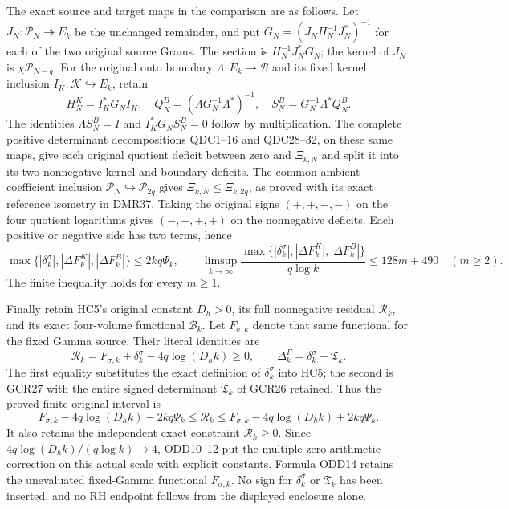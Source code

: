\documentclass[11pt,a4paper]{article}
\begin{document}
The exact source and target maps in the comparison are as follows.
Let $J_N:\mathcal P_N\twoheadrightarrow E_k$ be the unchanged
remainder, and put $G_N=(J_NH_N^{-1}J_N^*)^{-1}$ for each
of the two original source Grams. The section is
$H_N^{-1}J_N^*G_N$; the kernel of $J_N$ is
$\chi\mathcal P_{N-q}$. For the original onto boundary
$\Lambda:E_k\to\mathcal B$ and its fixed kernel inclusion
$I_K:\mathcal K\hookrightarrow E_k$, retain
\[
 H_N^K=I_K^*G_NI_K,\quad
 Q_N^B=(\Lambda G_N^{-1}\Lambda^*)^{-1},\quad
 S_N^B=G_N^{-1}\Lambda^*Q_N^B .
 \tag{ODD11}
\]
The identities $\Lambda S_N^B=I$ and $I_K^*G_NS_N^B=0$
follow by multiplication. The complete positive determinant
decompositions QDC1--16 and QDC28--32, on these same maps,
give each original quotient deficit between zero and
$\Xi_{k,N}$ and split it into its two nonnegative kernel
and boundary deficits. The common ambient coefficient inclusion
$\mathcal P_N\hookrightarrow\mathcal P_{2q}$ gives
$\Xi_{k,N}\leq\Xi_{k,2q}$, as proved with its exact reference
isometry in DMR37. Taking the original signs $(+,+,-,-)$
on the four quotient logarithms gives $(-,-,+,+)$ on the
nonnegative deficits. Each positive or negative side has two
terms, hence
\[
 \max\{|\delta_k^\sigma|,|\Delta F_k^K|,|\Delta F_k^B|\}
 \leq2kq\Psi_k,
 \qquad
 \limsup_{k\to\infty}
 \frac{\max\{|\delta_k^\sigma|,|\Delta F_k^K|,|\Delta F_k^B|\}}
      {q\log k}\leq128m+490\quad(m\geq2).
 \tag{ODD12}
\]
The finite inequality holds for every $m\geq1$.

Finally retain HC5's original constant $D_h>0$, its full
nonnegative residual $\mathcal R_k$, and its exact four-volume
functional $\mathcal B_k$. Let $F_{\sigma,k}$ denote that same
functional for the fixed Gamma source. Their literal identities are
\[
 \mathcal R_k=F_{\sigma,k}+\delta_k^\sigma
                        -4q\log(D_hk)\geq0,
 \qquad
 \Delta_k^\Gamma=\delta_k^\sigma-\mathfrak T_k.
 \tag{ODD13}
\]
The first equality substitutes the exact definition of
$\delta_k^\sigma$ into HC5; the second is GCR27 with the
entire signed determinant $\mathfrak T_k$ of GCR26 retained.
Thus the proved finite original interval is
\[
 F_{\sigma,k}-4q\log(D_hk)-2kq\Psi_k
 \leq\mathcal R_k\leq
 F_{\sigma,k}-4q\log(D_hk)+2kq\Psi_k .
 \tag{ODD14}
\]
It also retains the independent exact constraint $\mathcal R_k\geq0$.
Since $4q\log(D_hk)/(q\log k)\to4$, ODD10--12 put the
multiple-zero arithmetic correction on this actual scale with
explicit constants. Formula ODD14 retains the unevaluated
fixed-Gamma functional $F_{\sigma,k}$. No sign for $\delta_k^\sigma$ or
$\mathfrak T_k$ has been inserted, and no RH endpoint follows
from the displayed enclosure alone.
\end{document}
